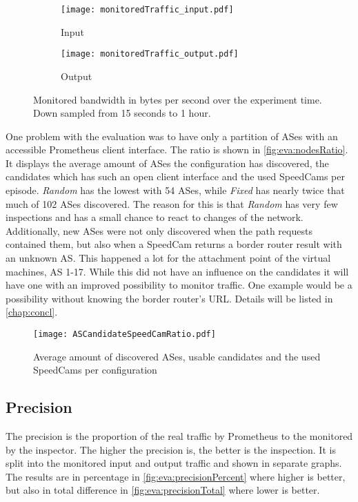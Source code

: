\documentclass[thesis.tex]{subfiles}
\begin{document}
\begin{figure}[h]
	\centering
	\begin{subfigure}{.8\linewidth}
		\centering
		\texttt{[image: monitoredTraffic\_input.pdf]}
		\caption{Input}
		\label{fig:eva:monitoredTraffic:input}
	\end{subfigure}
	\hfill
	\begin{subfigure}{0.8\linewidth}
		\centering
		\texttt{[image: monitoredTraffic\_output.pdf]}
		\caption{Output}
		\label{fig:eva:monitoredTraffic:output}
	\end{subfigure}
	\caption{Monitored bandwidth in bytes per second over the experiment time. Down sampled from 15 seconds to 1 hour.}
	\label{fig:eva:monitoredTraffic}
\end{figure}

One problem with the evaluation was to have only a partition of ASes with an accessible Prometheus client interface. The ratio is shown in \autoref{fig:eva:nodesRatio}. It displays the average amount of ASes the configuration has discovered, the candidates which has such an open client interface and the used SpeedCams per episode. \textit{Random} has the lowest with 54 ASes, while \textit{Fixed} has nearly twice that much of 102 ASes discovered. The reason for this is that \textit{Random} has very few inspections and has a small chance to react to changes of the network. Additionally, new ASes were not only discovered when the path requests contained them, but also when a SpeedCam returns a border router result with an unknown AS. This happened a lot for the attachment point of the virtual machines, AS 1-17. While this did not have an influence on the candidates it will have one with an improved possibility to monitor traffic. One example would be a possibility without knowing the border router's URL. Details will be listed in \autoref{chap:concl}.

\begin{figure}[h]
	\centering
	\texttt{[image: ASCandidateSpeedCamRatio.pdf]}
	\caption{Average amount of discovered ASes, usable candidates and the used SpeedCams per configuration}
	\label{fig:eva:nodesRatio}
\end{figure}

\subsection{Precision} \label{sec:eva:precision}

The precision is the proportion of the real traffic by Prometheus to the monitored by the inspector. The higher the precision is, the better is the inspection. It is split into the monitored input and output traffic and shown in separate graphs. The results are in percentage in \autoref{fig:eva:precisionPercent} where higher is better, but also in total difference in \autoref{fig:eva:precisionTotal} where lower is better.
\end{document}
